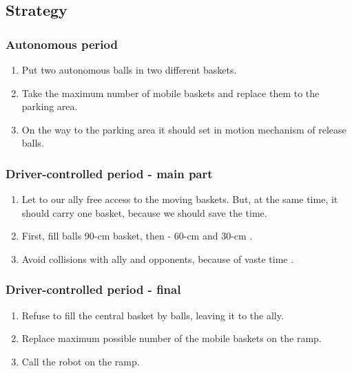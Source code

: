 \subsection{Strategy} 
\subsubsection{Autonomous period}
\begin{enumerate}
    \item Put two autonomous balls in two different baskets.
	\item Take the maximum number of mobile baskets and replace them to the parking area.
	\item On the way to the parking area it should set in motion mechanism of release balls.
	         
\end{enumerate}
\subsubsection{Driver-controlled period - main part}
\begin{enumerate}
	\item Let to our ally free access to the moving baskets. But, at the same time, it should carry one basket, because we should save the time.
	\item First, fill balls 90-cm basket, then - 60-cm and 30-cm .
	\item Avoid collisions with ally and opponents, because of vaste time .
\end{enumerate}
\subsubsection{Driver-controlled period - final}
\begin{enumerate}
	\item Refuse to fill the central basket by balls, leaving it to the ally.
	\item Replace maximum possible number of the mobile baskets on the ramp.
	\item Call the robot on the ramp. 
\end{enumerate}
\fillpage

